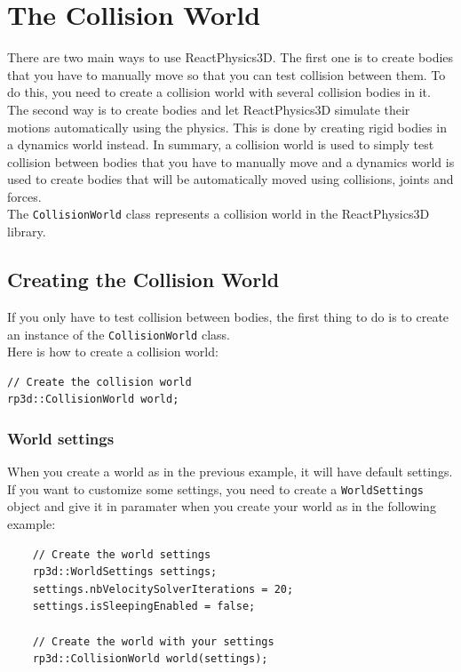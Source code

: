 \documentclass[a4paper,12pt]{article}
\begin{document}
   \section{The Collision World}
     \label{sec:collisionworld}

    There are two main ways to use ReactPhysics3D. The first one is to create bodies that you have to manually move so that you can test collision between them. To do this,
    you need to create a collision world with several collision bodies in it. The second way is to create bodies and let ReactPhysics3D simulate their motions automatically using the
    physics. This is done by creating rigid bodies in a dynamics world instead. In summary, a collision world is used to simply test collision between bodies that you have to manually move
    and a dynamics world is used to create bodies that will be automatically moved using collisions, joints and forces. \\

    The \texttt{CollisionWorld} class represents a collision world in the ReactPhysics3D library.

    \subsection{Creating the Collision World}

    If you only have to test collision between bodies, the first thing to do is to create an instance of the \texttt{CollisionWorld} class. \\

    Here is how to create a collision world: \\

    \begin{lstlisting}
// Create the collision world
rp3d::CollisionWorld world;
    \end{lstlisting}

    \subsubsection{World settings}

    When you create a world as in the previous example, it will have default settings. If you want to customize some settings, you need to create
    a \texttt{WorldSettings} object and give it in paramater when you create your world as in the following example: \\

    \begin{lstlisting}
    // Create the world settings
    rp3d::WorldSettings settings;
    settings.nbVelocitySolverIterations = 20;
    settings.isSleepingEnabled = false;

    // Create the world with your settings
    rp3d::CollisionWorld world(settings);
    \end{lstlisting}
\end{document}
